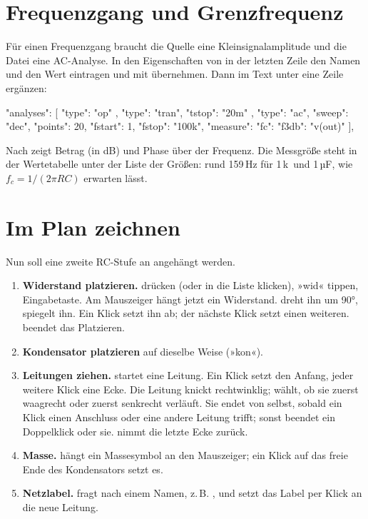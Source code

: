 \section{Frequenzgang und Grenzfrequenz}

Für einen Frequenzgang braucht die Quelle eine Kleinsignalamplitude und die
Datei eine AC-Analyse. In den Eigenschaften von  in der letzten
Zeile  den Namen  und den Wert  eintragen und
mit \taste{+} übernehmen. Dann im Text unter  eine Zeile
ergänzen:

\begin{json}
"analyses": [
  { "type": "op" },
  { "type": "tran", "tstop": "20m" },
  { "type": "ac", "sweep": "dec", "points": 20, "fstart": 1, "fstop": "100k",
    "measure": { "fc": { "f3db": "v(out)" } } }
],
\end{json}

Nach  zeigt  Betrag (in dB) und Phase
über der Frequenz. Die Messgröße  steht in der Wertetabelle unter
der Liste der Größen: rund 159\,Hz für 1\,k\ohm\ und 1\,µF, wie
$f_c = 1/(2\pi RC)$ erwarten lässt.

\section{Im Plan zeichnen}

Nun soll eine zweite RC-Stufe an  angehängt werden.

\begin{enumerate}
  \item \textbf{Widerstand platzieren.}  drücken (oder in die
    Liste  klicken), »wid« tippen, Eingabetaste. Am
    Mauszeiger hängt jetzt ein Widerstand.  dreht ihn um 90°,
     spiegelt ihn. Ein Klick setzt ihn ab; der nächste Klick setzt
    einen weiteren.  beendet das Platzieren.
  \item \textbf{Kondensator platzieren} auf dieselbe Weise (»kon«).
  \item \textbf{Leitungen ziehen.}  startet eine Leitung. Ein Klick
    setzt den Anfang, jeder weitere Klick eine Ecke. Die Leitung knickt
    rechtwinklig; \taste{/} wählt, ob sie zuerst waagrecht oder zuerst
    senkrecht verläuft. Sie endet von selbst, sobald ein Klick einen
    Anschluss oder eine andere Leitung trifft; sonst beendet ein Doppelklick
    oder  sie.  nimmt die letzte Ecke zurück.
  \item \textbf{Masse.}  hängt ein Massesymbol an den Mauszeiger;
    ein Klick auf das freie Ende des Kondensators setzt es.
  \item \textbf{Netzlabel.}  fragt nach einem Namen, z.\,B.
    , und setzt das Label per Klick an die neue Leitung.
\end{enumerate}

